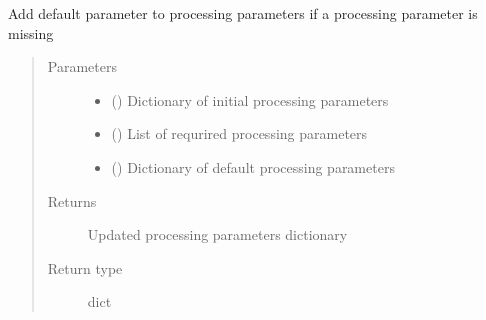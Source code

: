 \documentclass[letterpaper,10pt,english]{sphinxmanual}
\begin{document}
\begin{fulllineitems}
\label{\detokenize{dnpNMR:dnpLab.dnpNMR.update_parameters}}
Add default parameter to processing parameters if a processing parameter is missing
\begin{quote}\begin{description}
\item[{Parameters}] \leavevmode\begin{itemize}
\item {} 
 () \sphinxhyphen{}\sphinxhyphen{} Dictionary of initial processing parameters

\item {} 
 () \sphinxhyphen{}\sphinxhyphen{} List of requrired processing parameters

\item {} 
 () \sphinxhyphen{}\sphinxhyphen{} Dictionary of default processing parameters

\end{itemize}

\item[{Returns}] \leavevmode
Updated processing parameters dictionary

\item[{Return type}] \leavevmode
dict

\end{description}\end{quote}

\end{fulllineitems}

\end{document}
